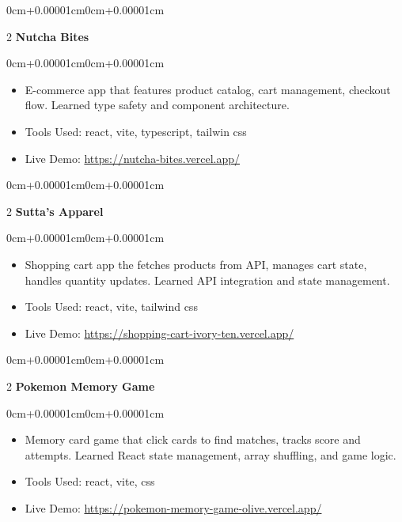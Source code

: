 \documentclass[10pt, letterpaper]{article}
\newenvironment{highlights}{\begin{itemize}[topsep=0.10cm,parsep=0.10cm,partopsep=0pt,itemsep=0pt,leftmargin=0cm+10pt]}{\end{itemize}}
\newenvironment{onecolentry}{\begin{adjustwidth}{0cm+0.00001cm}{0cm+0.00001cm}}{\end{adjustwidth}}
\newenvironment{twocolentry}[2][]{\onecolentry\def\secondColumn{#2}\setcolumnwidth{\fill,8cm}\begin{paracol}{2}}{\switchcolumn \raggedleft \secondColumn\end{paracol}\endonecolentry}
\begin{document}
    \begin{twocolentry}{2025}
      \textbf{Nutcha Bites}\end{twocolentry}
    \vspace{0.10cm}
    \begin{onecolentry}
      \begin{highlights}
        \item E-commerce app that features product catalog, cart management, checkout flow. Learned type safety and component architecture.
        \item Tools Used: react, vite, typescript, tailwin css
        \item Live Demo: \href{https://nutcha-bites.vercel.app/}{https://nutcha-bites.vercel.app/}
      \end{highlights}
    \end{onecolentry}
    \vspace{0.15cm}
  

    \begin{twocolentry}{2025}
      \textbf{Sutta's Apparel}\end{twocolentry}
    \vspace{0.10cm}
    \begin{onecolentry}
      \begin{highlights}
        \item Shopping cart app the fetches products from API, manages cart state, handles quantity updates. Learned API integration and state management.
        \item Tools Used: react, vite, tailwind css
        \item Live Demo: \href{https://shopping-cart-ivory-ten.vercel.app/}{https://shopping-cart-ivory-ten.vercel.app/}
      \end{highlights}
    \end{onecolentry}
    \vspace{0.15cm}
  

    \begin{twocolentry}{2025}
      \textbf{Pokemon Memory Game}\end{twocolentry}
    \vspace{0.10cm}
    \begin{onecolentry}
      \begin{highlights}
        \item Memory card game that click cards to find matches, tracks score and attempts. Learned React state management, array shuffling, and game logic.
        \item Tools Used: react, vite, css
        \item Live Demo: \href{https://pokemon-memory-game-olive.vercel.app/}{https://pokemon-memory-game-olive.vercel.app/}
      \end{highlights}
    \end{onecolentry}
    \vspace{0.15cm}
  
\end{document}
